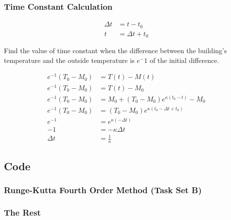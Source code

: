 \documentclass[titlepage]{article}
\begin{document}
\subsubsection{Time Constant Calculation}\label{calc:time constant}
\begin{align*}
    \Delta t &= t-t_0 \tag{definition of time constant}\\
    t &= \Delta t +t_0 
\end{align*}
\begin{center}
    Find the value of time constant when the difference between the building's temperature and
    the outside temperature is $e^-1$ of the initial difference.
\end{center}
\begin{align*}
 e^{-1}(T_0-M_0)&= T(t)-M(t) \\
 e^{-1}(T_0-M_0)&= T(t)-M_0\\
 e^{-1}(T_0-M_0)&= M_0+(T_0-M_0)e^{\kappa (t_0 - t) } - M_0\\
 e^{-1}(T_0-M_0)&=(T_0-M_0)e^{\kappa (t_0 - \Delta t + t_0) } \\
 e^{-1}&=e^{\kappa (- \Delta t) } \\
 -1&=-\kappa \Delta t   \\
 \Delta t &= \frac{1}{\kappa}
\end{align*}
\subsection{Code}
\subsubsection{Runge-Kutta Fourth Order Method (Task Set B)}\label{Runge-Kutta}

\subsubsection{The Rest}









\end{document}
